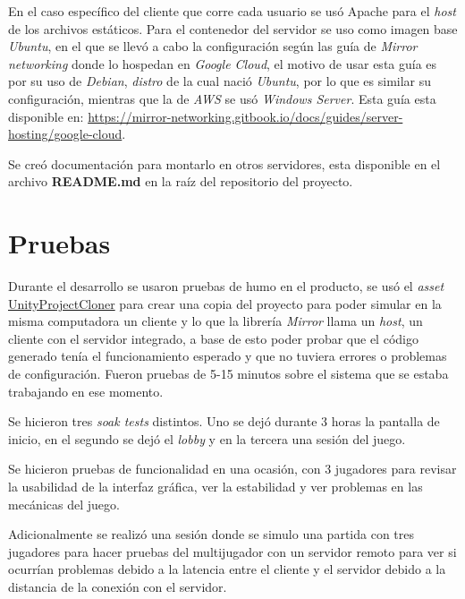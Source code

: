 En el caso específico del cliente que corre cada usuario se usó Apache para el \textit{host} de los archivos estáticos.
Para el contenedor del servidor se uso como imagen base \textit{Ubuntu}, en el que se llevó a cabo la configuración según las guía de \textit{Mirror networking} donde lo hospedan en \textit{Google Cloud}, el motivo de usar esta guía es por su uso de \textit{Debian}, \textit{distro} de la cual nació \textit{Ubuntu}, por lo que es similar su configuración, mientras que la de \textit{AWS} se usó \textit{Windows Server}. Esta guía esta disponible en: \url{https://mirror-networking.gitbook.io/docs/guides/server-hosting/google-cloud}.

Se creó documentación para montarlo en otros servidores, esta disponible en el archivo \textbf{README.md} en la raíz del repositorio del proyecto.

\section{Pruebas}
Durante el desarrollo se usaron pruebas de humo en el producto, se usó el \textit{asset} \href{https://github.com/hwaet/UnityProjectCloner}{UnityProjectCloner} para crear una copia del proyecto para poder simular en la misma computadora un cliente y lo que la librería \textit{Mirror} llama un \textit{host}, un cliente con el servidor integrado, a base de esto poder probar que el código generado tenía el funcionamiento esperado y que no tuviera errores o problemas de configuración. Fueron pruebas de 5-15 minutos sobre el sistema que se estaba trabajando en ese momento.

Se hicieron tres \textit{soak tests} distintos. Uno se dejó durante 3 horas la pantalla de inicio, en el segundo se dejó el \textit{lobby} y en la tercera una sesión del juego.

Se hicieron pruebas de funcionalidad en una ocasión, con 3 jugadores para revisar la usabilidad de la interfaz gráfica, ver la estabilidad y ver problemas en las mecánicas del juego.

Adicionalmente se realizó una sesión donde se simulo una partida con tres jugadores para hacer pruebas del multijugador con un servidor remoto para ver si ocurrían problemas debido a la latencia entre el cliente y el servidor debido a la distancia de la conexión con el servidor.